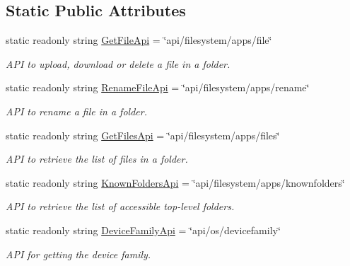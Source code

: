 \subsection*{Static Public Attributes}
\begin{DoxyCompactItemize}
\item 
static readonly string \hyperlink{class_microsoft_1_1_tools_1_1_windows_device_portal_1_1_device_portal_a8d486bbeae299edc6aa7def85d81a07f}{Get\+File\+Api} = \char`\"{}api/filesystem/apps/file\char`\"{}
\begin{DoxyCompactList}\small\item\em A\+PI to upload, download or delete a file in a folder. \end{DoxyCompactList}\item 
static readonly string \hyperlink{class_microsoft_1_1_tools_1_1_windows_device_portal_1_1_device_portal_a9f526de7393319fb1f7550cd73f31b5f}{Rename\+File\+Api} = \char`\"{}api/filesystem/apps/rename\char`\"{}
\begin{DoxyCompactList}\small\item\em A\+PI to rename a file in a folder. \end{DoxyCompactList}\item 
static readonly string \hyperlink{class_microsoft_1_1_tools_1_1_windows_device_portal_1_1_device_portal_ac3cea434721424b2a8191a5cf60f7569}{Get\+Files\+Api} = \char`\"{}api/filesystem/apps/files\char`\"{}
\begin{DoxyCompactList}\small\item\em A\+PI to retrieve the list of files in a folder. \end{DoxyCompactList}\item 
static readonly string \hyperlink{class_microsoft_1_1_tools_1_1_windows_device_portal_1_1_device_portal_a3aa5a2c076c8489ca9491653397b01b5}{Known\+Folders\+Api} = \char`\"{}api/filesystem/apps/knownfolders\char`\"{}
\begin{DoxyCompactList}\small\item\em A\+PI to retrieve the list of accessible top-\/level folders. \end{DoxyCompactList}\item 
static readonly string \hyperlink{class_microsoft_1_1_tools_1_1_windows_device_portal_1_1_device_portal_aaf5a2a13e142ef456e4e803cdd18bcdb}{Device\+Family\+Api} = \char`\"{}api/os/devicefamily\char`\"{}
\begin{DoxyCompactList}\small\item\em A\+PI for getting the device family. \end{DoxyCompactList}\item 

\end{DoxyCompactItemize}
